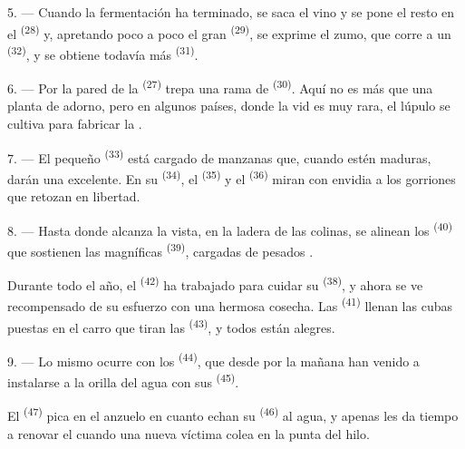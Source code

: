 5. --- Cuando la fermentación ha terminado, se saca el vino y se pone el
resto en el  \textsuperscript{(28)} y, apretando poco a poco el gran
 \textsuperscript{(29)}, se exprime el zumo, que corre a un
 \textsuperscript{(32)}, y se obtiene todavía más 
\textsuperscript{(31)}.

\VUsaut{6.0mm}
\VUsaut{3.4mm}

6. --- Por la pared de la  \textsuperscript{(27)} trepa una rama de
 \textsuperscript{(30)}. Aquí no es más que una planta de adorno,
pero en algunos países, donde la vid es muy rara, el lúpulo se cultiva
para fabricar la .

7. --- El pequeño  \textsuperscript{(33)} está cargado de manzanas
que, cuando estén maduras, darán una  excelente. En su
 \textsuperscript{(34)}, el  \textsuperscript{(35)} y el
 \textsuperscript{(36)} miran con envidia a los gorriones que
retozan en libertad.

8. --- Hasta donde alcanza la vista, en la ladera de las colinas, se
alinean los  \textsuperscript{(40)} que sostienen las magníficas
 \textsuperscript{(39)}, cargadas de pesados .

Durante todo el año, el  \textsuperscript{(42)} ha trabajado para
cuidar su  \textsuperscript{(38)}, y ahora se ve recompensado de su
esfuerzo con una hermosa cosecha. Las 
\textsuperscript{(41)} llenan las cubas puestas en el carro que tiran las
 \textsuperscript{(43)}, y todos están alegres.

\VUsaut{5.0mm}
\VUsaut{3.4mm}

9. --- Lo mismo ocurre con los  \textsuperscript{(44)},
que desde por la mañana han venido a instalarse a la orilla del agua con
sus  \textsuperscript{(45)}.

El  \textsuperscript{(47)} pica en el anzuelo en cuanto echan su
 \textsuperscript{(46)} al agua, y apenas les da tiempo a renovar el
 cuando una nueva víctima colea en la punta del hilo.

